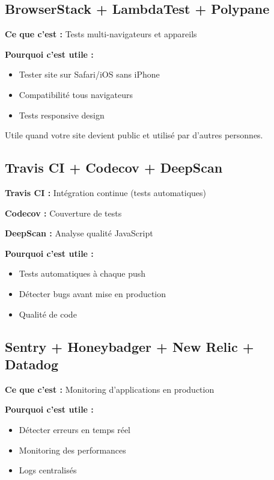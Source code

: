 \documentclass[11pt,a4paper]{article}
\begin{document}
\subsection{BrowserStack + LambdaTest + Polypane}

\textbf{Ce que c'est :} Tests multi-navigateurs et appareils

\textbf{Pourquoi c'est utile :}
\begin{itemize}
    \item Tester site sur Safari/iOS sans iPhone
    \item Compatibilité tous navigateurs
    \item Tests responsive design
\end{itemize}

\begin{conseil}
Utile quand votre site devient public et utilisé par d'autres personnes.
\end{conseil}

\subsection{Travis CI + Codecov + DeepScan}

\textbf{Travis CI :} Intégration continue (tests automatiques)

\textbf{Codecov :} Couverture de tests

\textbf{DeepScan :} Analyse qualité JavaScript

\textbf{Pourquoi c'est utile :}
\begin{itemize}
    \item Tests automatiques à chaque push
    \item Détecter bugs avant mise en production
    \item Qualité de code
\end{itemize}

\subsection{Sentry + Honeybadger + New Relic + Datadog}

\textbf{Ce que c'est :} Monitoring d'applications en production

\textbf{Pourquoi c'est utile :}
\begin{itemize}
    \item Détecter erreurs en temps réel
    \item Monitoring des performances
    \item Logs centralisés
\end{itemize}
\end{document}
